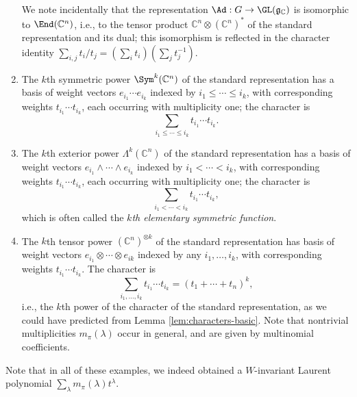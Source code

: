 \documentclass[reqno]{amsart} 
\begin{document}
\begin{example}
\begin{enumerate}
    We note incidentally that the representation $\Ad : G \rightarrow \GL(\mathfrak{g}_{\mathbb{C}})$ is isomorphic to $\End(\mathbb{C}^n)$, i.e., to the tensor product $\mathbb{C}^n \otimes (\mathbb{C}^n)^*$ of the standard representation and its dual; this isomorphism is reflected in the character identity $\sum_{i,j} t_i/t_j = (\sum_i t_i) (\sum_j t_j^{-1})$.
  \item The $k$th symmetric power $\Sym^k(\mathbb{C}^n)$ of the standard representation has a basis of weight vectors $e_{i_1} \dotsb e_{i_k}$ indexed by $i_1 \leq \dotsb \leq i_k$, with corresponding weights $t_{i_1} \dotsb t_{i_k}$, each occurring with multiplicity one; the character is
    \begin{equation}\label{eq:wts-sym-k}
      \sum_{i_1 \leq \dotsb \leq i_k} t_{i_1} \dotsb t_{i_k}.
    \end{equation}
  \item The $k$th exterior power $\Lambda^k(\mathbb{C}^n)$ of the standard representation has a basis of weight vectors $e_{i_1} \wedge \dotsb \wedge e_{i_k}$ indexed by $i_1 < \dotsb < i_k$, with corresponding weights $t_{i_1} \dotsb t_{i_k}$, each occurring with multiplicity one; the character is
    \begin{equation*}
      \sum_{i_1 < \dotsb < i_k} t_{i_1} \dotsb t_{i_k},
    \end{equation*}
    which is often called the \emph{$k$th elementary symmetric function}.
  \item The $k$th tensor power $(\mathbb{C}^n)^{\otimes k}$ of the standard representation has basis of weight vectors $e_{i_1} \otimes \dotsb \otimes e_{i k}$ indexed by any $i_1,\dotsc,i_k$, with corresponding weights $t_{i_1} \dotsb t_{i_k}$.  The character is
    \begin{equation*}
      \sum_{i_1,\dotsc,i_k} t_{i_1} \dotsb t_{i_k} = (t_1 + \dotsb + t_n)^k,
    \end{equation*}
    i.e., the $k$th power of the character of the standard representation, as we could have predicted from Lemma \ref{lem:characters-basic}.  Note that nontrivial multiplicities $m_\pi(\lambda)$ occur in general, and are given by multinomial coefficients.
  \end{enumerate}
\end{example}
Note that in all of these examples, we indeed obtained a $W$-invariant Laurent polynomial $\sum_{\lambda} m_\pi(\lambda) t^\lambda$.
\end{document}
